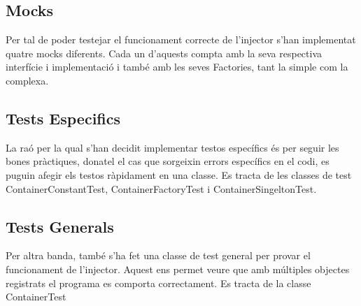 
\subsection{Mocks}
Per tal de poder testejar el funcionament correcte de l'injector s'han implementat quatre mocks diferents. Cada un d'aquests compta amb la seva respectiva interfície i implementació i també amb les seves Factories, tant la simple com la complexa.
\subsection{Tests Especifics}
La raó per la qual s'han decidit implementar testos específics és per seguir les bones pràctiques, donatel el cas que sorgeixin errors específics en el codi, es puguin afegir els testos ràpidament en una classe. Es tracta de les classes de test ContainerConstantTest, ContainerFactoryTest i ContainerSingeltonTest.
\subsection{Tests Generals}
Per altra banda, també s'ha fet una classe de test general per provar el funcionament de l'injector. Aquest ens permet veure que amb múltiples objectes registrats el programa es comporta correctament. Es tracta de la classe ContainerTest
